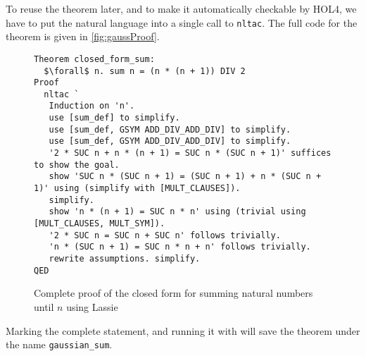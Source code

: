 To reuse the theorem later, and to make it automatically checkable by HOL4, we
have to put the natural language into a single call to \lstinline{nltac}.
The full code for the theorem is given in \autoref{fig:gaussProof}.
%
\begin{figure}[t]
\begin{lstlisting}[mathescape=true]
Theorem closed_form_sum:
  $\forall$ n. sum n = (n * (n + 1)) DIV 2
Proof
  nltac `
   Induction on 'n'.
   use [sum_def] to simplify.
   use [sum_def, GSYM ADD_DIV_ADD_DIV] to simplify.
   use [sum_def, GSYM ADD_DIV_ADD_DIV] to simplify.
   '2 * SUC n + n * (n + 1) = SUC n * (SUC n + 1)' suffices to show the goal.
   show 'SUC n * (SUC n + 1) = (SUC n + 1) + n * (SUC n + 1)' using (simplify with [MULT_CLAUSES]).
   simplify.
   show 'n * (n + 1) = SUC n * n' using (trivial using [MULT_CLAUSES, MULT_SYM]).
   '2 * SUC n = SUC n + SUC n' follows trivially.
   'n * (SUC n + 1) = SUC n * n + n' follows trivially.
   rewrite assumptions. simplify.
QED
\end{lstlisting}
\caption{Complete proof of the closed form for summing natural numbers until $n$ using Lassie}\label{fig:gaussProof}
\end{figure}

Marking the complete statement, and running it with  will save the
theorem under the name \lstinline{gaussian_sum}.
